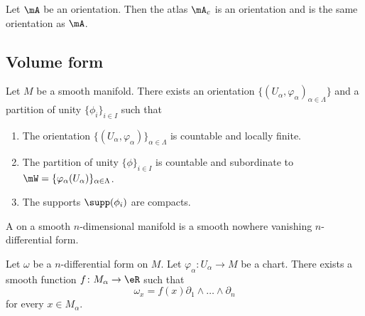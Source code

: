 \begin{proposition}		\label{PROPooHQSSooDCjlIX}
	Let \( \mA\) be an orientation. Then the atlas \( \mA_c\) is an orientation and is the same orientation as \( \mA\).
\end{proposition}

\subsection{Volume form}

\begin{proposition}		\label{PROPooBIVHooXOycnS}
	Let \( M\) be a smooth manifold. There exists an orientation \( \{ (U_{\alpha},\varphi_{\alpha})_{\alpha\in \Lambda} \}\) and a partition of unity \( \{ \phi_i \}_{i\in I}\) such that
	\begin{enumerate}
		\item
		      The orientation \( \{ (U_{\alpha},\varphi_{\alpha}) \}_{\alpha\in \Lambda}\) is countable and locally finite.
		\item
		      The partition of unity \( \{ \phi \}_{i\in I}\)  is countable and subordinate to \( \mW=\{ \varphi_{\alpha}(U_{\alpha}) \}_{\alpha\in \Lambda}\).
		\item
		      The supports \( \supp(\phi_i)\) are compacts.
	\end{enumerate}
\end{proposition}



\begin{definition}			\label{DEFooOBZEooMZauZF}
	A  on a smooth \(n \)-dimensional manifold is a smooth nowhere vanishing \( n\)-differential form.
\end{definition}

\begin{lemma}		\label{LEMooQGVMooSHXUmD}
	Let \( \omega\) be a \( n\)-differential form on \( M\). Let \(\varphi_{\alpha} \colon U_{\alpha} \to M  \) be a chart. There exists a smooth function \(f \colon M_{\alpha}\to \eR   \) such that
	\begin{equation}
		\omega_x=f(x)\partial_1\wedge\ldots\wedge\partial_n
	\end{equation}
	for every \( x\in M_{\alpha}\).
\end{lemma}

